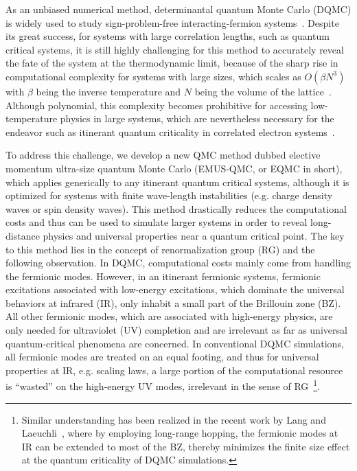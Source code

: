 \documentclass[aps,prx,twocolumn,superscriptaddress,showpacs,floatfix]{revtex4-1}
\begin{document}
As an unbiased numerical method, determinantal quantum Monte Carlo (DQMC) is widely used to study sign-problem-free interacting-fermion systems~\cite{BSS1981,Hirsch_1983,White1989,Assaad1996,Assaad1999,AssaadEvertz2008,Meng2010,He2016a,He2016b}. Despite its great success, for systems with large correlation lengths, such as quantum critical systems, it is still highly challenging for this method to accurately reveal the fate of the system at the thermodynamic limit, because of the sharp rise in computational complexity for systems with large sizes, which scales as $O\left(\beta N^3\right)$ with $\beta$ being the inverse temperature and $N$ being the volume of the lattice~\cite{White1989,AssaadEvertz2008}.
Although polynomial, this complexity becomes prohibitive for accessing low-temperature physics in large systems, which are nevertheless necessary for the endeavor such as itinerant quantum criticality in correlated electron systems~\cite{Hertz1976,Millis1993,Moriya1985,Loehneysen2007}.

To address this challenge, we develop a new QMC method dubbed elective momentum ultra-size quantum Monte Carlo (EMUS-QMC, or EQMC in short), which applies generically to any itinerant quantum critical systems, although it is optimized for systems with finite wave-length instabilities (e.g. charge density waves or spin density waves). This method drastically reduces the computational costs and thus can be used to simulate larger systems in order to reveal long-distance physics and universal properties near a quantum critical point. The key to this method lies in the concept of renormalization group (RG) and the following observation. In DQMC, computational costs mainly come from handling the fermionic modes. However, in an itinerant fermionic systems, fermionic excitations associated with low-energy excitations, which dominate the universal behaviors at infrared (IR), only inhabit a small part of the Brillouin zone (BZ). All other fermionic modes, which are associated with high-energy physics, are only needed for ultraviolet (UV) completion and are irrelevant as far as universal quantum-critical phenomena are concerned. In conventional DQMC simulations, all fermionic modes are treated on an equal footing, and thus for universal properties at IR, e.g.  scaling laws, a large portion of the computational resource is ``wasted'' on the high-energy UV modes, irrelevant in the sense of RG~\footnote{Similar understanding has been realized in the recent work by Lang and Laeuchli~\cite{Lang2018}, where by employing long-range hopping, the fermionic modes at IR can be extended to most of the BZ, thereby minimizes the finite size effect at the quantum criticality of DQMC simulations.}.
\end{document}

